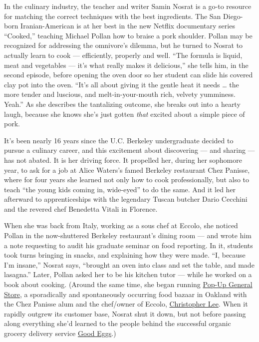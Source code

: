 In the culinary industry, the teacher and writer Samin Nosrat is a go-to
resource for matching the correct techniques with the best ingredients.
The San Diego-born Iranian-American is at her best in the new Netflix
documentary series ``Cooked,'' teaching Michael Pollan how to braise a
pork shoulder. Pollan may be recognized for addressing the omnivore's
dilemma, but he turned to Nosrat to actually learn to cook ---
efficiently, properly and well. ``The formula is liquid, meat and
vegetables --- it's what really makes it delicious,'' she tells him, in
the second episode, before opening the oven door so her student can
slide his covered clay pot into the oven. ``It's all about giving it the
gentle heat it needs \ldots{} the more tender and luscious, and
melt-in-your-mouth rich, velvety yumminess. Yeah.'' As she describes the
tantalizing outcome, she breaks out into a hearty laugh, because she
knows she's just gotten \emph{that} excited about a simple piece of
pork.

It's been nearly 16 years since the U.C. Berkeley undergraduate decided
to pursue a culinary career, and this excitement about discovering ---
and sharing --- has not abated. It is her driving force. It propelled
her, during her sophomore year, to ask for a job at Alice Waters's famed
Berkeley restaurant Chez Panisse, where for four years she learned not
only how to cook professionally, but also to teach ``the young kids
coming in, wide-eyed'' to do the same. And it led her afterward to
apprenticeships with the legendary Tuscan butcher Dario Cecchini and the
revered chef Benedetta Vitali in Florence.

When she was back from Italy, working as a sous chef at Eccolo, she
noticed Pollan in the now-shuttered Berkeley restaurant's dining room
--- and wrote him a note requesting to audit his graduate seminar on
food reporting. In it, students took turns bringing in snacks, and
explaining how they were made. ``I, because I'm insane,'' Nosrat says,
``brought an oven into class and set the table, and made lasagna.''
Later, Pollan asked her to be his kitchen tutor --- while he worked on a
book about cooking. (Around the same time, she began running
\href{http://popupgeneralstore.blogspot.com/}{Pop-Up General Store}, a
sporadically and spontaneously occurring food bazaar in Oakland with the
Chez Panisse alum and the chef/owner of Eccolo,
\href{http://oldfashionedbutcher.blogspot.com/}{Christopher Lee}. When
it rapidly outgrew its customer base, Nosrat shut it down, but not
before passing along everything she'd learned to the people behind the
successful organic grocery delivery service
\href{http://www.nytimes3xbfgragh.onion/2014/08/05/t-magazine/good-eggs-company-lunches-tomato-tart-corn-soup-fruit-butterhead-lettuce-recipes.html}{Good
Eggs}.)

